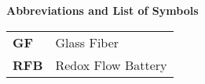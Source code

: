 \documentclass[../main.tex]{subfiles}
\begin{document}

\begin{center}
    {\fontsize{16}{1.5em} \selectfont \textbf{Abbreviations and List of Symbols}}
\end{center}

\bgroup
\def\arraystretch{1.5}
\begin{table}[H]
    \begin{center}
        \begin{tabular}{ll}
            \textbf{GF}         & Glass Fiber           \\
            \textbf{RFB}        & Redox Flow Battery    \\
        \end{tabular}
    \end{center}
\end{table}
\egroup

\medskip
\end{document}
